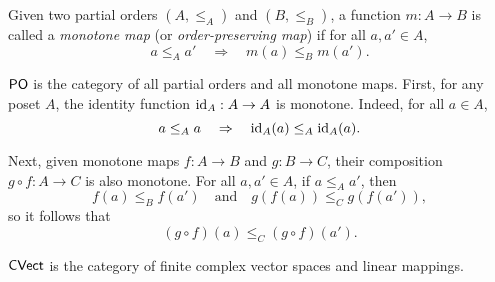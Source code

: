 \begin{definition}
Given two partial orders \((A, \leq_A)\) and \((B,\leq_B)\), a function \(m: A \to B\) is called a \emph{monotone map} (or \emph{order-preserving map}) if for all \(a, a' \in A\),
\[
a \leq_A a' \quad \Rightarrow \quad m(a) \leq_B m(a').
\]
\end{definition}



\begin{example}
  $\mathsf{PO}$ is the category of all partial orders and all monotone maps. First, for any poset \(A\), the identity function \(\mathrm{id}_A : A \to A\) is monotone. Indeed, for all \(a \in A\),
\[
a \leq_A a \quad \Rightarrow \quad \mathrm{id}_A(a) \leq_A \mathrm{id}_A(a).
\]

Next, given monotone maps \(f : A \to B\) and \(g : B \to C\), their composition \(g \circ f : A \to C\) is also monotone. For all \(a, a' \in A\), if \(a \leq_A a'\), then
\[
f(a) \leq_B f(a') \quad \text{and} \quad g(f(a)) \leq_C g(f(a')),
\]
so it follows that
\[
(g \circ f)(a) \leq_C (g \circ f)(a').
\]

\end{example}



\begin{example}
 $\mathsf{CVect}$ is the category of finite complex vector spaces and linear mappings.
\end{example}

\begin{comment}
\begin{example}
Given a functional programming language $L$, we can define a category $\catCompFunc$.  In this category, the objects represent the data types of the language \( L \), and the morphisms correspond to computable functions or programs. A function is considered \emph{computable} if a computer program is capable of executing that function.

The composition of morphisms is defined as follows: given two morphisms \( f \colon X \to Y \) and \( g \colon Y \to Z \), the composition \( g \circ f \colon X \to Z \) is defined by applying \( g \) to the output of \( f \). This composition is often written as \( f;g \).

Additionally, the identity morphism \( \id_X \colon X \to X \) represents the ``identity program," which returns its input without making any changes (i.e., it "does nothing").
\end{example}
\end{comment}


